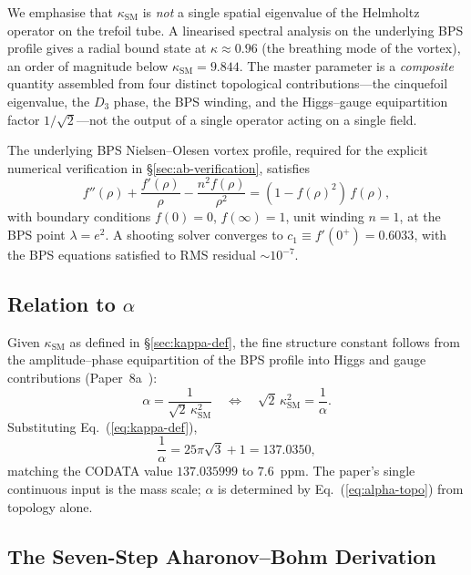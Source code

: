 \documentclass[11pt]{article}
\newcommand{\ksm}{\kappa_\text{SM}}
\begin{document}
We emphasise that $\ksm$ is \emph{not} a single spatial eigenvalue
of the Helmholtz operator on the trefoil tube.  A linearised
spectral analysis on the underlying BPS profile gives a radial
bound state at $\kappa \approx 0.96$ (the breathing mode of the
vortex), an order of magnitude below $\ksm = 9.844$.  The master
parameter is a \emph{composite} quantity assembled from four
distinct topological contributions---the cinquefoil eigenvalue,
the $D_3$ phase, the BPS winding, and the Higgs--gauge
equipartition factor $1/\sqrt{2}$---not the output of a single
operator acting on a single field.

The underlying BPS Nielsen--Olesen vortex profile, required for
the explicit numerical verification in
\S\ref{sec:ab-verification}, satisfies
\begin{equation}
  f''(\rho) + \frac{f'(\rho)}{\rho} - \frac{n^2 f(\rho)}{\rho^2}
  = (1 - f(\rho)^2)\, f(\rho),
\end{equation}
with boundary conditions $f(0)=0$, $f(\infty)=1$, unit winding
$n=1$, at the BPS point $\lambda = e^2$.  A shooting solver
converges to $c_1 \equiv f'(0^+) = 0.6033$, with the BPS equations
satisfied to RMS residual $\sim 10^{-7}$.

\subsection{Relation to $\alpha$}

Given $\ksm$ as defined in \S\ref{sec:kappa-def}, the fine
structure constant follows from the amplitude--phase equipartition
of the BPS profile into Higgs and gauge contributions
(Paper~8a~\cite{NWT8a}):
\begin{equation}
  \boxed{
    \alpha = \frac{1}{\sqrt{2}\,\ksm^2} \quad\Leftrightarrow\quad
    \sqrt{2}\,\ksm^2 = \frac{1}{\alpha}.
  }
\label{eq:alpha-kappa}
\end{equation}
Substituting Eq.~(\ref{eq:kappa-def}),
\begin{equation}
  \frac{1}{\alpha} = 25\pi\sqrt{3} + 1 = 137.0350,
\label{eq:alpha-topo}
\end{equation}
matching the CODATA value $137.035999$ to $7.6$~ppm.  The paper's
single continuous input is the mass scale; $\alpha$ is determined
by Eq.~(\ref{eq:alpha-topo}) from topology alone.

\subsection{The Seven-Step Aharonov--Bohm Derivation}
\label{sec:ab-derivation}
\end{document}
